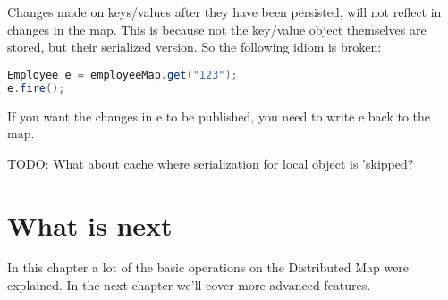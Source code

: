 Changes made on keys/values after they have been persisted, will not reflect in changes in the map. This is because not the key/value object themselves are stored, but their serialized version. So the following idiom is broken:
\begin{lstlisting}[language=java]
Employee e = employeeMap.get("123");
e.fire();
\end{lstlisting}
If you want the changes in e to be published, you need to write e back to the map.

TODO: What about cache where serialization for local object is 'skipped?

\section{What is next}
In this chapter a lot of the basic operations on the Distributed Map were explained. In the next chapter we'll cover more advanced features.
